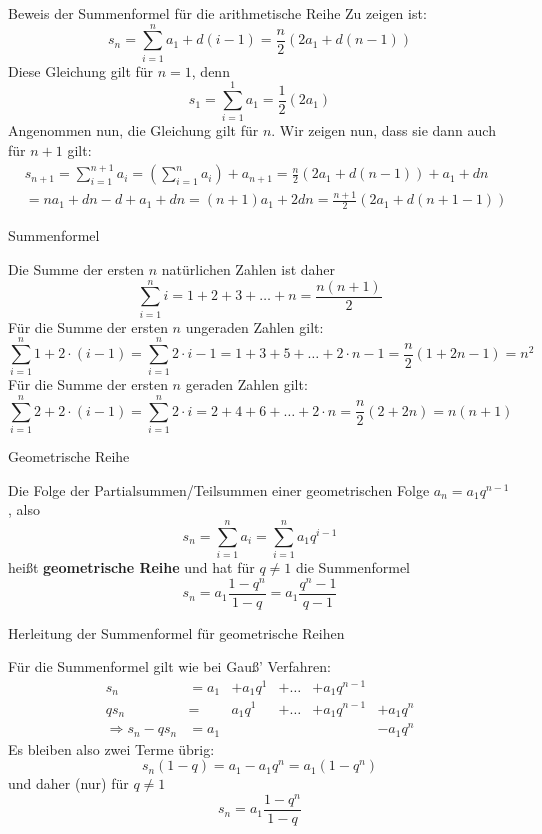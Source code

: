 \begin{frame}{Beweis der Summenformel für die arithmetische Reihe}
	\small{	Zu zeigen ist: 
		\[
			s_{n} = \sum_{i=1}^{n} a_{1} + d (i-1) = \frac{n}{2} \left(2a_{1} + d (n-1)\right)
		\]
		Diese Gleichung gilt für $n=1$, denn
		\[
			s_{1} = \sum_{i=1}^{1} a_{1} = \frac{1}{2}\left(2 a_{1} \right)
		\]
		Angenommen nun, die Gleichung gilt für $n$. Wir zeigen nun, dass sie dann auch für $n+1$ gilt:
		\begin{align*}
		& s_{n+1} = \sum_{i=1}^{n+1} a_{i}  = \left( \sum_{i=1}^{n} a_{i} \right) + a_{n+1}  = \frac{n}{2} \left( 2 a_{1} + d(n-1) \right) + a_{1} + d n \\
		& = n a_{1} +  d n - d + a_{1} + dn   = (n+1) a_{1} + 2dn  = \frac{n+1}{2} \left( 2a_{1} + d (n+1 -1) \right)
 		\end{align*}}
\end{frame}
\begin{frame}{Summenformel}
	\begin{example}
		Die Summe der ersten $n$ natürlichen Zahlen ist daher
		\[
			\sum_{i=1}^{n} i = 1 + 2 + 3 + \ldots + n = \frac{n(n+1)}{2}	
	 \]
	 \small{
	 Für die Summe der ersten $n$ ungeraden Zahlen gilt:
	 \[
		 \sum_{i=1}^{n} 1 + 2 \cdot (i-1) = \sum_{i=1}^{n} 2\cdot i -1 =  1 + 3 + 5 + \ldots + 2\cdot n - 1 = \frac{n}{2}\left( 1 + 2n-1 \right) = n^{2}
	 \]
	 Für die Summe der ersten $n$ geraden Zahlen gilt:
	 \[
	 \sum_{i=1}^{n} 2 + 2 \cdot (i-1) = \sum_{i=1}^{n} 2\cdot i =  2 + 4 + 6 + \ldots + 2\cdot n = \frac{n}{2}\left( 2 + 2n \right) = n(n+1)
	 \]
	}
	\end{example}
\end{frame}

\begin{frame}{Geometrische Reihe}
		\begin{definition}
			Die Folge der Partialsummen/Teilsummen einer geometrischen Folge $a_{n} = a_{1} q^{n-1}$, also
			\[
			s_{n} = \sum_{i=1}^{n} a_{i} = \sum_{i=1}^{n} a_{1} q^{i-1}
			\]
			heißt \textbf{geometrische Reihe} und hat für $q\neq 1 $ die Summenformel
			\[
				s_{n} = a_{1} \frac{1-q^{n}}{1-q} = a_{1} \frac{q^{n}-1}{q-1} 
			\]
		\end{definition}	
\end{frame}

\begin{frame}{Herleitung der Summenformel für geometrische Reihen}	
	\begin{example}
		Für die Summenformel gilt wie bei Gauß' Verfahren:
		\begin{align*}	
		s_{n} & = a_1  & + a_{1} q^{1} & + \ldots  & + a_{1}  q^{n-1}  \\
		q s_{n} & = &  a_{1} q^{1} & + \ldots  & + a_{1} q^{n-1} & + a_{1} q^{n}  \\ 
		\hline
		\Rightarrow s_{n} -q s_{n} & = a_{1}  &  &  & & - a_{1} q^{n} 
		\end{align*}
		Es bleiben also zwei Terme übrig:
		\[
			s_{n} \left( 1-q \right) = a_{1} - a_{1} q^{n} = a_{1} \left( 1 - q^{n} \right)
		\]
		und daher (nur) für $q \neq 1$
		\[
			s_{n} = a_{1} \frac{1-q^{n}}{1-q}
		\]	
	\end{example}	
\end{frame}

